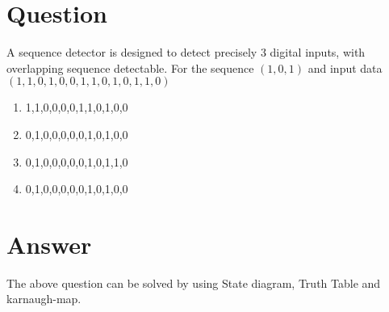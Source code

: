 \documentclass[journal,12pt,twocolumn]{IEEEtran}
\title{\ktitle}
\author{\kauthor\\\kcontact\\\kmodule}
\begin{document}
\maketitle
\tableofcontents
\section{\textbf{Question}}
A sequence detector is designed to detect precisely 3 digital inputs, with overlapping sequence detectable. For the sequence $(1,0,1)$ and input data $(1,1,0,1,0,0,1,1,0,1,0,1,1,0)$ 
\begin{enumerate}
    \item 1,1,0,0,0,0,1,1,0,1,0,0
    \item 0,1,0,0,0,0,0,1,0,1,0,0
    \item 0,1,0,0,0,0,0,1,0,1,1,0
    \item 0,1,0,0,0,0,0,1,0,1,0,0
\end{enumerate}

\section{\textbf{Answer}} 
The above question can be solved by using State diagram, Truth Table and karnaugh-map.\\
 
\end{document}
